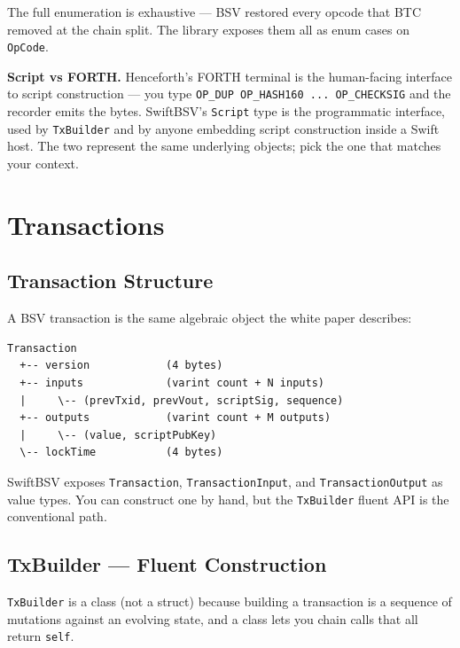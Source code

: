 \documentclass[a4paper, 11pt, openany]{book}
\begin{document}
The full enumeration is exhaustive --- BSV restored every opcode that BTC removed at the chain split. The library exposes them all as enum cases on \texttt{OpCode}.

\begin{notebox}
\textbf{Script vs FORTH.} Henceforth's FORTH terminal is the human-facing interface to script construction --- you type \texttt{OP\_DUP OP\_HASH160 ... OP\_CHECKSIG} and the recorder emits the bytes. SwiftBSV's \texttt{Script} type is the programmatic interface, used by \texttt{TxBuilder} and by anyone embedding script construction inside a Swift host. The two represent the same underlying objects; pick the one that matches your context.
\end{notebox}

\chapter{Transactions}

\section{Transaction Structure}

A BSV transaction is the same algebraic object the white paper describes:

\begin{verbatim}
Transaction
  +-- version            (4 bytes)
  +-- inputs             (varint count + N inputs)
  |     \-- (prevTxid, prevVout, scriptSig, sequence)
  +-- outputs            (varint count + M outputs)
  |     \-- (value, scriptPubKey)
  \-- lockTime           (4 bytes)
\end{verbatim}

SwiftBSV exposes \texttt{Transaction}, \texttt{TransactionInput}, and \texttt{TransactionOutput} as value types. You can construct one by hand, but the \texttt{TxBuilder} fluent API is the conventional path.

\section{TxBuilder --- Fluent Construction}

\texttt{TxBuilder} is a class (not a struct) because building a transaction is a sequence of mutations against an evolving state, and a class lets you chain calls that all return \texttt{self}.
\end{document}
